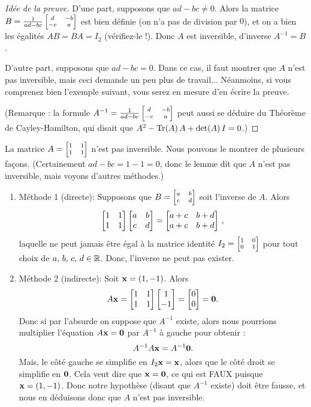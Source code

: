 \begin{proof}[Idée de la preuve]
D'une part, supposons que $ad-bc \neq 0$. Alors la matrice $B=\frac{1}{ad-bc} \scriptsize\left[ \begin{matrix} d & -b \\ -c & a \end{matrix} \right]$ est bien définie (on n'a pas de division par $0$), et on a bien les égalités $AB = BA = I_2$ (vérifiez-le !). Donc $A$ est inversible, d'inverse $A^{-1} = B$.

D'autre part, supposons que $ad-bc=0$. Dans ce cas, il faut montrer que $A$ n'est pas inversible, mais ceci demande un peu plus de travail... Néanmoins, si vous comprenez bien l'exemple suivant, vous serez en mesure d'en écrire la preuve.

(Remarque : la formule $A^{-1}=\frac{1}{ad-bc} \scriptsize\left[ \begin{matrix} d & -b \\ -c & a \end{matrix} \right]$ peut aussi se déduire du Théorème de Cayley-Hamilton, qui disait que $A^2 - {\rm Tr}(A)\,A + \det(A)\,I=0$.)
\end{proof}


\begin{myexample} \label{ex: matrice carree non-inversible} La matrice $A = \scriptsize\left[ \begin{matrix} 1 & 1\\ 1 & 1 \end{matrix} \right]$ n'est pas inversible. 
Nous pouvons le montrer de plusieurs façons.  (Certainement $ad-bc = 1-1=0$, donc
le lemme dit que $A$ n'est pas inversible, mais voyons d'autres méthodes.)
\begin{enumerate}
\item M\'ethode 1 (directe):  Supposons que $B = \scriptsize\left[ \begin{matrix} a&b\\c&d \end{matrix} \right]$ soit l'inverse de $A$.  Alors
$$
\left[ \begin{matrix} 1 & 1\\ 1 & 1 \end{matrix} \right]\left[ \begin{matrix} a & b\\c&d \end{matrix} \right] = \left[ \begin{matrix} a+c & b+d \\ a+c & b+d \end{matrix} \right]\,,
$$
laquelle ne peut jamais être égal à la matrice identité $I_2=\scriptsize\left[ \begin{matrix} 1 & 0\\ 0 & 1 \end{matrix} \right]$ pour tout choix de $a,\, b,\,c,\, d\in\mathbb{R}$.  Donc, l'inverse ne peut pas exister.
\item Méthode 2 (indirecte): Soit $\mathbf{x} = (1,-1)$.  Alors
$$
A\mathbf{x} = \left[ \begin{matrix} 1 & 1 \\ 1 & 1 \end{matrix} \right] \left[ \begin{matrix} 1\\-1 \end{matrix} \right] = \left[ \begin{matrix} 0\\0 \end{matrix} \right] = \mathbf{0}.
$$
Donc si par l'absurde on suppose que $A^{-1}$ existe, alors
nous pourrions multiplier l'équation $A\mathbf{x} = \mathbf{0}$
par $A^{-1}$ à gauche pour obtenir :
$$
A^{-1} A \mathbf{x} = A^{-1} \mathbf{0}.
$$
Mais, le côté gauche se simplifie en $I_2 \mathbf{x}=\mathbf{x}$, alors que le côté droit se simplifie en $\mathbf{0}$.  Cela veut dire que $\mathbf{x}=\mathbf{0}$, ce qui est FAUX puisque $\mathbf{x} = (1, -1)$.  Donc notre hypothèse (disant que $A^{-1}$ existe) doit être fausse, et nous en déduisons donc que $A$ n'est pas inversible.
\end{enumerate}
 \end{myexample}

